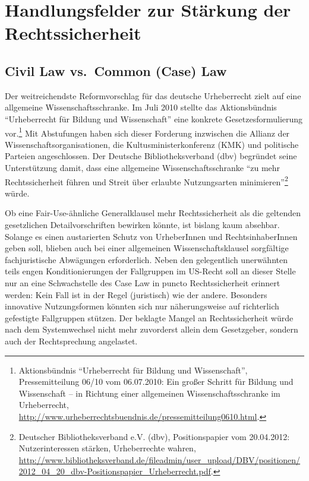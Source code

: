 \documentclass[output=paper]{langscibook}
\begin{document}
\hypertarget{handlungsfelder-zur-stuxe4rkung-der-rechtssicherheit}{%
\section{Handlungsfelder zur Stärkung der
Rechtssicherheit}\label{handlungsfelder-zur-stuxe4rkung-der-rechtssicherheit}}

\hypertarget{civil-law-vs.-common-case-law}{%
\subsection{Civil Law vs.~Common (Case)
Law}\label{civil-law-vs.-common-case-law}}

Der weitreichendste Reformvorschlag für das deutsche Urheberrecht zielt
auf eine allgemeine Wissenschaftsschranke. Im Juli 2010 stellte das
Aktionsbündnis \enquote{Urheberrecht für Bildung und Wissenschaft} eine
konkrete Gesetzesformulierung vor.\footnote{Aktionsbündnis
  \enquote{Urheberrecht für Bildung und Wissenschaft}, Pressemitteilung
  06/10 vom 06.07.2010: Ein großer Schritt für Bildung und Wissenschaft
  -- in Richtung einer allgemeinen Wissenschaftsschranke im
  Urheberrecht,
  \url{http://www.urheberrechtsbuendnis.de/pressemitteilung0610.html}.}
Mit Abstufungen haben sich dieser Forderung inzwischen die Allianz der
Wissenschaftsorganisationen, die Kultusministerkonferenz (KMK) und
politische Parteien angeschlossen. Der Deutsche Bibliotheksverband (dbv)
begründet seine Unterstützung damit, dass eine allgemeine
Wissenschaftsschranke \enquote{zu mehr Rechtssicherheit führen und
Streit über erlaubte Nutzungsarten minimieren}\footnote{Deutscher
  Bibliotheksverband e.V. (dbv), Positionspapier vom 20.04.2012:
  Nutzerinteressen stärken, Urheberrechte wahren,
  \url{http://www.bibliotheksverband.de/fileadmin/user_upload/DBV/positionen/2012_04_20_dbv-Positionspapier_Urheberrecht.pdf}.}
würde.

Ob eine Fair-Use-ähnliche Generalklausel mehr Rechtssicherheit als die
geltenden gesetzlichen Detailvorschriften bewirken könnte, ist bislang
kaum absehbar. Solange es einen austarierten Schutz von UrheberInnen und
RechtsinhaberInnen geben soll, blieben auch bei einer allgemeinen
Wissenschaftsklausel sorgfältige fachjuristische Abwägungen
erforderlich. Neben den gelegentlich unerwähnten teils engen
Konditionierungen der Fallgruppen im US-Recht soll an dieser Stelle nur
an eine Schwachstelle des Case Law in puncto Rechtssicherheit erinnert
werden: Kein Fall ist in der Regel (juristisch) wie der andere.
Besonders innovative Nutzungsformen könnten sich nur näherungsweise auf
richterlich gefestigte Fallgruppen stützen. Der beklagte Mangel an
Rechtssicherheit würde nach dem Systemwechsel nicht mehr zuvorderst
allein dem Gesetzgeber, sondern auch der Rechtsprechung angelastet.
\end{document}
